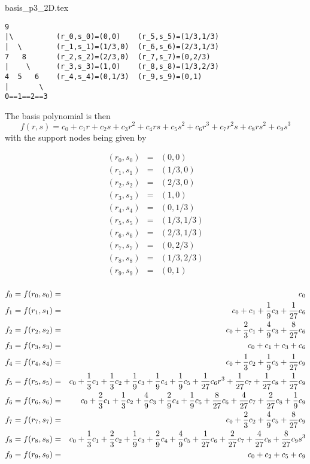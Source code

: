 \begin{flushright} {\tiny {\color{gray} basis\_p3\_2D.tex}} \end{flushright}

\begin{verbatim}
9
|\          (r_0,s_0)=(0,0)    (r_5,s_5)=(1/3,1/3)
|  \        (r_1,s_1)=(1/3,0)  (r_6,s_6)=(2/3,1/3)
7   8       (r_2,s_2)=(2/3,0)  (r_7,s_7)=(0,2/3)
|    \      (r_3,s_3)=(1,0)    (r_8,s_8)=(1/3,2/3)
4  5   6    (r_4,s_4)=(0,1/3)  (r_9,s_9)=(0,1)
|       \ 
0==1==2==3
\end{verbatim}
The basis polynomial is then
\[
f(r,s) = c_0 + c_1 r+ c_2 s + c_3r^2 + c_4 rs + c_5 s^2
+c_6 r^3 + c_7 r^2s + c_8 rs^2 + c_9 s^3
\]
with the support nodes being given by 

\begin{eqnarray}
(r_0,s_0) &=& (0,0) \\
(r_1,s_1) &=& (1/3,0) \\
(r_2,s_2) &=& (2/3,0) \\
(r_3,s_3) &=& (1,0) \\
(r_4,s_4) &=& (0,1/3) \\
(r_5,s_5) &=& (1/3,1/3) \\
(r_6,s_6) &=& (2/3,1/3) \\
(r_7,s_7) &=& (0,2/3) \\
(r_8,s_8) &=& (1/3,2/3) \\
(r_9,s_9) &=& (0,1) \\
\end{eqnarray}


\begin{eqnarray}
f_0 = f(r_0,s_0) &=& c_0 \nonumber\\
f_1 = f(r_1,s_1) &=& c_0 + c_1 + \frac19 c_3 + \frac{1}{27} c_6 \nonumber\\
f_2 = f(r_2,s_2) &=& c_0 + \frac23 c_1 + \frac{4}{9} c_3 + \frac{8}{27} c_6\nonumber\\
f_3 = f(r_3,s_3) &=& c_0 + c_1 + c_3 + c_6 \nonumber\\
f_4 = f(r_4,s_4) &=& c_0 + \frac13 c_2   + \frac19 c_5 + \frac{1}{27} c_9 \nonumber\\
f_5 = f(r_5,s_5) &=& c_0 + \frac13 c_1 + \frac13 c_2 + \frac19 c_3 
+ \frac19 c_4  + \frac19 c_5 + \frac{1}{27}c_6 r^3 + \frac{1}{27}c_7 + \frac{1}{27}c_8 + \frac{1}{27} c_9 \nonumber\\
f_6 = f(r_6,s_6) &=& c_0 + \frac23 c_1 + \frac13 c_2  
+ \frac49 c_3+ \frac29 c_4 + \frac19 c_5 + \frac{8}{27}c_6 +\frac{4}{27} c_7 +\frac{2}{27} c_8 +\frac19 c_9 \nonumber\\
f_7 = f(r_7,s_7) &=& c_0 + \frac23 c_2  + \frac49c_5 + \frac{8}{27}c_9 \nonumber\\
f_8 = f(r_8,s_8) &=& c_0 + \frac13c_1 + \frac23 c_2 + \frac19 c_3
+ \frac29 c_4  + \frac49 c_5 
+ \frac{1}{27}c_6  + \frac{2}{27}c_7  + \frac{4}{27}c_8 + \frac{8}{27}c_9 s^3 \nonumber\\
f_9 = f(r_9,s_9) &=& c_0 + c_2 + c_5 + c_9 
\end{eqnarray}


